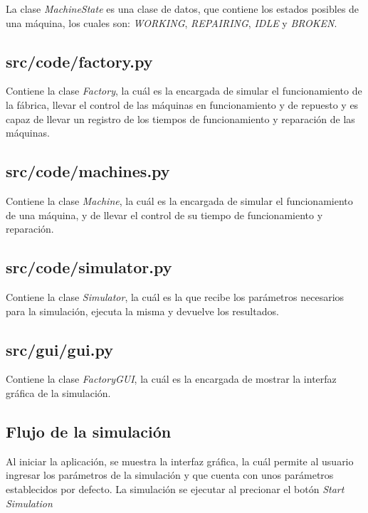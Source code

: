 \documentclass{article}
\begin{document}
La clase \textit{MachineState} es una clase de datos, que contiene los estados posibles de una máquina, los cuales son: \textit{WORKING}, \textit{REPAIRING}, \textit{IDLE} y \textit{BROKEN}.

\subsection{src/code/factory.py}

Contiene la clase \textit{Factory}, la cuál es la encargada de simular el funcionamiento de la fábrica, llevar el control de las máquinas en funcionamiento y de repuesto y es capaz de llevar un registro de los tiempos de funcionamiento y reparación de las máquinas.

\subsection{src/code/machines.py}

Contiene la clase \textit{Machine}, la cuál es la encargada de simular el funcionamiento de una máquina, y de llevar el control de su tiempo de funcionamiento y reparación.

\subsection{src/code/simulator.py}

Contiene la clase \textit{Simulator}, la cuál es la que recibe los parámetros necesarios para la simulación, ejecuta la misma y devuelve los resultados.

\subsection{src/gui/gui.py}

Contiene la clase \textit{FactoryGUI}, la cuál es la encargada de mostrar la interfaz gráfica de la simulación.

\subsection{Flujo de la simulación}

Al iniciar la aplicación, se muestra la interfaz gráfica, la cuál permite al usuario ingresar los parámetros de la simulación y que cuenta con unos parámetros establecidos por defecto. La simulación se ejecutar al precionar el botón \textit{Start Simulation}\\
\end{document}
